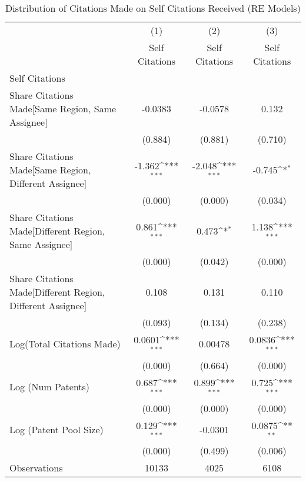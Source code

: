 {
\def\sym#1{\ifmmode^{#1}\else\(^{#1}\)\fi}
\begin{longtable}{l*{3}{c}}
\caption{Distribution of Citations Made on Self Citations Received (RE Models)  \label{model161718}}\\
\hline\hline\endfirsthead\hline\endhead\hline\endfoot\endlastfoot
                &\multicolumn{1}{c}{(1)}&\multicolumn{1}{c}{(2)}&\multicolumn{1}{c}{(3)}\\
                &\multicolumn{1}{c}{Self Citations}&\multicolumn{1}{c}{Self Citations}&\multicolumn{1}{c}{Self Citations}\\
\hline
Self Citations  &                  &                  &                  \\
Share Citations Made[Same Region, Same Assignee]&  -0.0383         &  -0.0578         &    0.132         \\
                &  (0.884)         &  (0.881)         &  (0.710)         \\
Share Citations Made[Same Region, Different Assignee]&   -1.362\sym{***}&   -2.048\sym{***}&   -0.745\sym{*}  \\
                &  (0.000)         &  (0.000)         &  (0.034)         \\
Share Citations Made[Different Region, Same Assignee]&    0.861\sym{***}&    0.473\sym{*}  &    1.138\sym{***}\\
                &  (0.000)         &  (0.042)         &  (0.000)         \\
Share Citations Made[Different Region, Different Assignee]&    0.108         &    0.131         &    0.110         \\
                &  (0.093)         &  (0.134)         &  (0.238)         \\
Log(Total Citations Made)&   0.0601\sym{***}&  0.00478         &   0.0836\sym{***}\\
                &  (0.000)         &  (0.664)         &  (0.000)         \\
Log (Num Patents)&    0.687\sym{***}&    0.899\sym{***}&    0.725\sym{***}\\
                &  (0.000)         &  (0.000)         &  (0.000)         \\
Log (Patent Pool Size)&    0.129\sym{***}&  -0.0301         &   0.0875\sym{**} \\
                &  (0.000)         &  (0.499)         &  (0.006)         \\
\hline
Observations    &    10133         &     4025         &     6108         \\

\end{longtable}}
